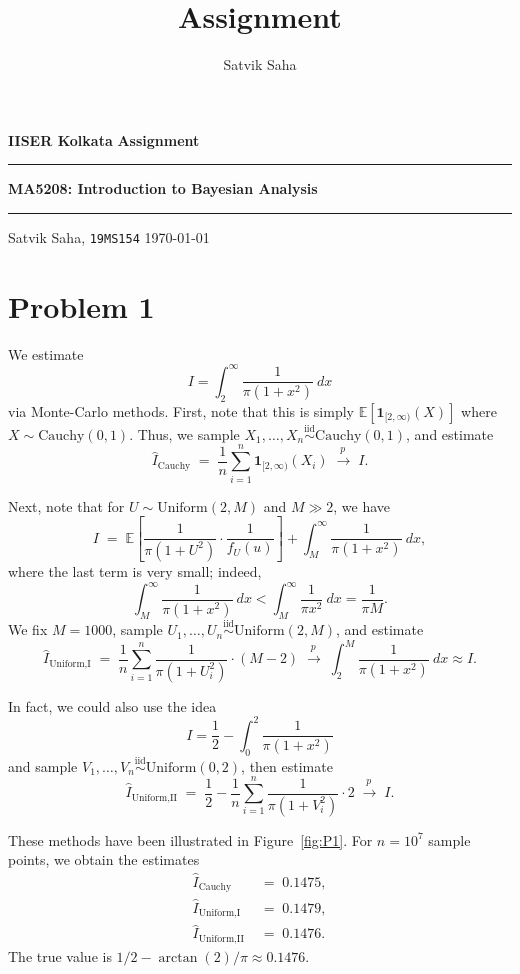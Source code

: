\documentclass[10pt]{article}
\title{Assignment}
\author{Satvik Saha}
\date{}
\newcommand{\E}{\mathbb{E}}
\newcommand{\iid}{\overset{\text{iid}}{\sim}}
\newcommand{\topr}{\overset{p\,}{\longrightarrow}}
\begin{document}
    \noindent\textbf{IISER Kolkata} \hfill \textbf{Assignment}
    \vspace{3pt}
    \hrule
    \vspace{3pt}
    \begin{center}
    \LARGE{\textbf{MA5208: Introduction to Bayesian Analysis}}
    \end{center}
    \vspace{3pt}
    \hrule
    \vspace{3pt}
    Satvik Saha, \texttt{19MS154} \hfill \today
    \vspace{20pt}

    \setlength{\parskip}{1em}


    \section*{Problem 1}

    We estimate \[
        I = \int_2^\infty \frac{1}{\pi(1 + x^2)} \:dx
    \] via Monte-Carlo methods.
    First, note that this is simply $\E[\bm{1}_{[2, \infty)}(X)]$ where $X
    \sim \text{Cauchy}(0, 1)$.
    Thus, we sample $X_1, \dots, X_n \iid \text{Cauchy}(0, 1)$, and estimate
    \[
        \hat{I}_{\text{Cauchy}} \;=\; \frac{1}{n} \sum_{i = 1}^n \bm{1}_{[2, \infty)}(X_i) \;\topr\; I.
    \]

    Next, note that for $U \sim \text{Uniform}(2, M)$ and $M \gg 2$, we have
    \[
        I \;=\; \E\left[\frac{1}{\pi(1 + U^2)}\cdot \frac{1}{f_U(u)}\right] + \int_M^\infty \frac{1}{\pi(1 + x^2)} \:dx,
    \] where the last term is very small; indeed, \[
        \int_M^\infty \frac{1}{\pi(1 + x^2)} \:dx < \int_M^\infty \frac{1}{\pi x^2} \:dx = \frac{1}{\pi M}.
    \]
    We fix $M = 1000$, sample $U_1, \dots, U_n \iid \text{Uniform}(2, M)$, and
    estimate \[
        \hat{I}_{\text{Uniform,I}} \;=\; \frac{1}{n} \sum_{i = 1}^n \frac{1}{\pi(1 + U_i^2)} \cdot (M - 2) \;\topr\; \int_2^M \frac{1}{\pi(1 + x^2)} \:dx \approx I.
    \]

    In fact, we could also use the idea \[
        I = \frac{1}{2} - \int_0^2 \frac{1}{\pi(1 + x^2)}
    \] and sample $V_1, \dots, V_n \iid \text{Uniform}(0, 2)$, then estimate
    \[
        \hat{I}_{\text{Uniform,II}} \;=\; \frac{1}{2} - \frac{1}{n} \sum_{i = 1}^n \frac{1}{\pi(1 + V_i^2)} \cdot 2 \;\topr\; I.
    \]

    These methods have been illustrated in Figure~\ref{fig:P1}. For $n = 10^7$
    sample points, we obtain the estimates
    \begin{align*}
        \hat{I}_{\text{Cauchy}} \;&=\; 0.1475, \\
        \hat{I}_{\text{Uniform,I}} \;&=\; 0.1479, \\
        \hat{I}_{\text{Uniform,II}} \;&=\; 0.1476.
    \end{align*}
    The true value is $1/2 - \arctan(2)/\pi \approx 0.1476$.
\end{document}
